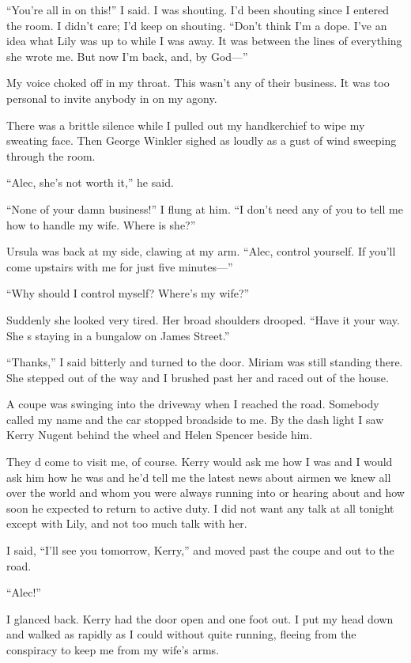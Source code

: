 {“You’re all in on this!” I said. I was shouting. I’d been shouting since I entered the room. I didn’t care; I’d keep on shouting. “Don’t think I’m a dope. I’ve an idea what Lily was up to while I was away. It was between the lines of everything she wrote me. But now I’m back, and, by God—”

My voice choked off in my throat. This wasn’t any of their business. It was too personal to invite anybody in on my agony.

There was a brittle silence while I pulled out my handkerchief to wipe my sweating face. Then George Winkler sighed as loudly as a gust of wind sweeping through the room.

“Alec, she’s not worth it,” he said.

“None of your damn business!” I flung at him. “I don’t need any of you to tell me how to handle my wife. Where is she?”

Ursula was back at my side, clawing at my arm. “Alec, control yourself. If you’ll come upstairs with me for just five minutes—”

“Why should I control myself? Where’s my wife?”

Suddenly she looked very tired. Her broad shoulders drooped. “Have it your way. She s staying in a bungalow on James Street.”

“Thanks,” I said bitterly and turned to the door. Miriam was still standing there. She stepped out of the way and I brushed past her and raced out of the house.

A coupe was swinging into the driveway when I reached the road. Somebody called my name and the car stopped broadside to me. By the dash light I saw Kerry Nugent behind the wheel and Helen Spencer beside him.

They d come to visit me, of course. Kerry would ask me how I was and I would ask him how he was and he’d tell me the latest news about airmen we knew all over the world and whom you were always running into or hearing about and how soon he expected to return to active duty. I did not want any talk at all tonight except with Lily, and not too much talk with her.

I said, “I’ll see you tomorrow, Kerry,” and moved past the coupe and out to the road.

“Alec!”

I glanced back. Kerry had the door open and one foot out. I put my head down and walked as rapidly as I could without quite running, fleeing from the conspiracy to keep me from my wife’s arms.

}
